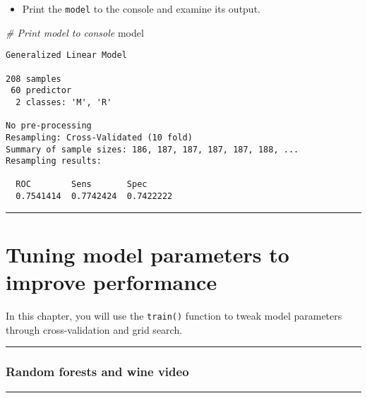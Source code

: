 \documentclass[
]{book}
\newenvironment{Shaded}{\begin{snugshade}}{\end{snugshade}}
\newcommand{\CommentTok}[1]{\textcolor[rgb]{0.56,0.35,0.01}{\textit{#1}}}
\newcommand{\NormalTok}[1]{#1}
\providecommand{\tightlist}{%
  \setlength{\itemsep}{0pt}\setlength{\parskip}{0pt}}
\begin{document}
\begin{itemize}
\tightlist
\item
  Print the \texttt{model} to the console and examine its output.
\end{itemize}

\begin{Shaded}
\begin{Highlighting}[]
\CommentTok{# Print model to console}
\NormalTok{model}
\end{Highlighting}
\end{Shaded}

\begin{verbatim}
Generalized Linear Model 

208 samples
 60 predictor
  2 classes: 'M', 'R' 

No pre-processing
Resampling: Cross-Validated (10 fold) 
Summary of sample sizes: 186, 187, 187, 187, 187, 188, ... 
Resampling results:

  ROC        Sens       Spec     
  0.7541414  0.7742424  0.7422222
\end{verbatim}

\begin{center}\rule{0.5\linewidth}{0.5pt}\end{center}

\hypertarget{tuning-model-parameters-to-improve-performance}{%
\chapter{Tuning model parameters to improve performance}\label{tuning-model-parameters-to-improve-performance}}

In this chapter, you will use the \texttt{train()} function to tweak model parameters through cross-validation and grid search.

\begin{center}\rule{0.5\linewidth}{0.5pt}\end{center}

\hypertarget{random-forests-and-wine-video}{%
\subsection*{Random forests and wine video}\label{random-forests-and-wine-video}}

\begin{center}\rule{0.5\linewidth}{0.5pt}\end{center}
\end{document}
